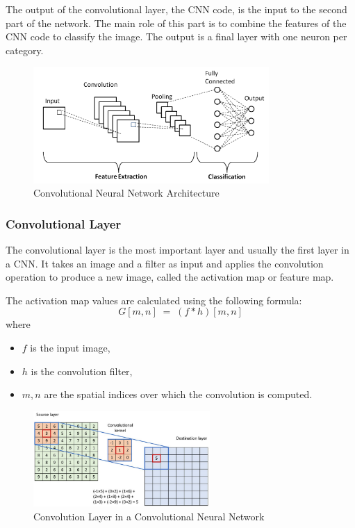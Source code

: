 The output of the convolutional layer, the CNN code, is the input to the second part of the network. The main role of this part is to combine the features of the CNN code to classify the image. The output is a final layer with one neuron per category.
\begin{figure}[H]
  \centering
  \includegraphics[width=0.8\textwidth]{Images/Chapter1/cnn.png}
  \caption{Convolutional Neural Network Architecture \cite{phung2019high}}
  \label{fig:cnn}
\end{figure}

\subsubsection{Convolutional Layer}
\label{sec:conv}

The convolutional layer is the most important layer and usually the first layer in a CNN. It takes an image and a filter as input and applies the convolution operation to produce a new image, called the activation map or feature map.

The activation map values are calculated using the following formula:
\begin{equation}
  G[m,n] \;=\; (f * h)[m,n]
\end{equation}
where
\begin{itemize}
  \item $f$ is the input image,
  \item $h$ is the convolution filter,
  \item $m,n$ are the spatial indices over which the convolution is computed.

\end{itemize}
\begin{figure}[H]
  \centering
  \includegraphics[width=0.6\textwidth]{Images/Chapter1/conv.png}
  \caption{Convolution Layer in a Convolutional Neural Network \cite{oulmi2018classification}}
  \label{fig:conv}
\end{figure}

